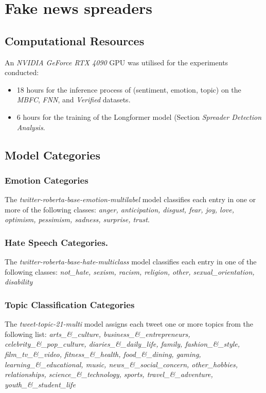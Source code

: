 \section{Fake news spreaders}
\subsection{Computational Resources}
\label{sec:appendix-models}
An \textit{NVIDIA GeForce RTX 4090} GPU was utilised for the experiments conducted:
\begin{itemize}
    \item 18 hours for the inference process of (sentiment, emotion, topic) on the \textit{MBFC}, \textit{FNN}, and \textit{Verified} datasets.
    \item 6 hours for the training of the Longformer model (Section \textit{Spreader Detection Analysis}.
\end{itemize}

\subsection{Model Categories}
\subsubsection{Emotion Categories}
\label{sec:emotion-list}
The \textit{twitter-roberta-base-emotion-multilabel} model classifies each entry in one or more of the following classes:
\textit{anger, anticipation, disgust, fear, joy, love, optimism, pessimism, sadness, surprise, trust}.

\subsubsection{Hate Speech Categories.}
\label{sec:hate-list}
The \textit{twitter-roberta-base-hate-multiclass}  model classifies each entry in one of the following classes: \textit{not\_hate, sexism, racism, religion, other, sexual\_orientation, disability}

\subsubsection{Topic Classification Categories}
\label{sec:topic-list}
The \textit{tweet-topic-21-multi} model assigns each tweet one or more topics from the following list: 
\textit{arts\_\&\_culture, business\_\&\_entrepreneurs, celebrity\_\&\_pop\_culture, diaries\_\&\_daily\_life, family, fashion\_\&\_style, film\_tv\_\&\_video, fitness\_\&\_health, food\_\&\_dining, gaming, learning\_\&\_educational, music, news\_\&\_social\_concern, other\_hobbies, relationships, science\_\&\_technology, sports, travel\_\&\_adventure, youth\_\&\_student\_life}


